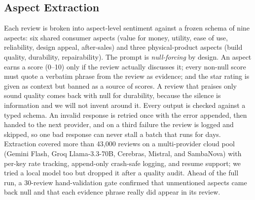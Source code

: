 \documentclass[journal]{IEEEtran}
\begin{document}
\subsection{Aspect Extraction}
Each review is broken into aspect-level sentiment against a frozen schema of nine aspects: six shared consumer aspects (value for money, utility, ease of use, reliability, design appeal, after-sales) and three physical-product aspects (build quality, durability, repairability). The prompt is \emph{null-forcing} by design. An aspect earns a score (0--10) only if the review actually discusses it; every non-null score must quote a verbatim phrase from the review as evidence; and the star rating is given as context but banned as a source of scores. A review that praises only sound quality comes back with null for durability, because the silence is information and we will not invent around it. Every output is checked against a typed schema. An invalid response is retried once with the error appended, then handed to the next provider, and on a third failure the review is logged and skipped, so one bad response can never stall a batch that runs for days. Extraction covered more than 43{,}000 reviews on a multi-provider cloud pool (Gemini Flash, Groq Llama-3.3-70B, Cerebras, Mistral, and SambaNova) with per-key rate tracking, append-only crash-safe logging, and resume support; we tried a local model too but dropped it after a quality audit. Ahead of the full run, a 30-review hand-validation gate confirmed that unmentioned aspects came back null and that each evidence phrase really did appear in its review.
\end{document}
